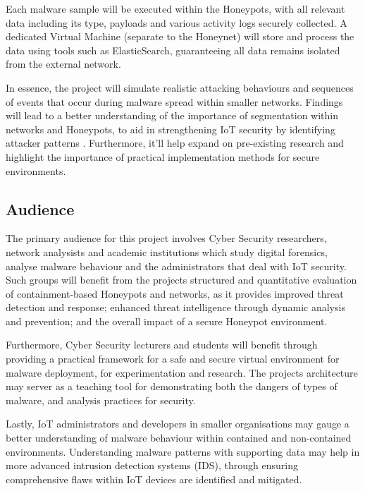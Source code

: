 \documentclass[a4paper,12pt,oneside]{book}			%
\begin{document}
Each malware sample will be executed within the Honeypots, with all relevant data including its type, payloads and various activity logs securely collected. A dedicated Virtual Machine (separate to the Honeynet) will store and process the data using tools such as ElasticSearch, guaranteeing all data remains isolated from the external network.

In essence, the project will simulate realistic attacking behaviours and sequences of events that occur during malware spread within smaller networks. Findings will lead to a better understanding of the importance of segmentation within networks and Honeypots, to aid in strengthening IoT security by identifying attacker patterns \textit{\citep{Kocaogullar2023honeypots}}. Furthermore, it’ll help expand on pre-existing research and highlight the importance of practical implementation methods for secure environments.  

\subsection{Audience}\label{sec:audience}

The primary audience for this project involves Cyber Security researchers, network analysists and academic institutions which study digital forensics, analyse malware behaviour and the administrators that deal with IoT security. Such groups will benefit from the projects structured and quantitative evaluation of containment-based Honeypots and networks, as it provides improved threat detection and response; enhanced threat intelligence through dynamic analysis and prevention; and the overall impact of a secure Honeypot environment. 

Furthermore, Cyber Security lecturers and students will benefit through providing a practical framework for a safe and secure virtual environment for malware deployment, for experimentation and research. The projects architecture may server as a teaching tool for demonstrating both the dangers of types of malware, and analysis practices for security.

Lastly, IoT administrators and developers in smaller organisations may gauge a better understanding of malware behaviour within contained and non-contained environments. Understanding malware patterns with supporting data may help in more advanced intrusion detection systems (IDS), through ensuring comprehensive flaws within IoT devices are identified \textit{\citep{fortinet-IDS}} and mitigated. 
\end{document}
